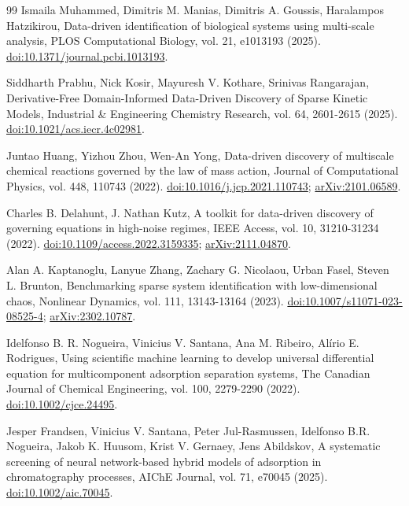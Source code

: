 \documentclass[11pt]{article}
\begin{document}
\begin{thebibliography}{99}
 Ismaila Muhammed, Dimitris M. Manias, Dimitris A. Goussis, Haralampos Hatzikirou, Data-driven identification of biological systems using multi-scale analysis, PLOS Computational Biology, vol. 21, e1013193 (2025). \href{https://doi.org/10.1371/journal.pcbi.1013193}{doi:10.1371/journal.pcbi.1013193}.

 Siddharth Prabhu, Nick Kosir, Mayuresh V. Kothare, Srinivas Rangarajan, Derivative-Free Domain-Informed Data-Driven Discovery of Sparse Kinetic Models, Industrial \& Engineering Chemistry Research, vol. 64, 2601-2615 (2025). \href{https://doi.org/10.1021/acs.iecr.4c02981}{doi:10.1021/acs.iecr.4c02981}.

 Juntao Huang, Yizhou Zhou, Wen-An Yong, Data-driven discovery of multiscale chemical reactions governed by the law of mass action, Journal of Computational Physics, vol. 448, 110743 (2022). \href{https://doi.org/10.1016/j.jcp.2021.110743}{doi:10.1016/j.jcp.2021.110743}; \href{https://arxiv.org/abs/2101.06589}{arXiv:2101.06589}.

 Charles B. Delahunt, J. Nathan Kutz, A toolkit for data-driven discovery of governing equations in high-noise regimes, IEEE Access, vol. 10, 31210-31234 (2022). \href{https://doi.org/10.1109/access.2022.3159335}{doi:10.1109/access.2022.3159335}; \href{https://arxiv.org/abs/2111.04870}{arXiv:2111.04870}.

 Alan A. Kaptanoglu, Lanyue Zhang, Zachary G. Nicolaou, Urban Fasel, Steven L. Brunton, Benchmarking sparse system identification with low-dimensional chaos, Nonlinear Dynamics, vol. 111, 13143-13164 (2023). \href{https://doi.org/10.1007/s11071-023-08525-4}{doi:10.1007/s11071-023-08525-4}; \href{https://arxiv.org/abs/2302.10787}{arXiv:2302.10787}.

 Idelfonso B. R. Nogueira, Vinicius V. Santana, Ana M. Ribeiro, Alírio E. Rodrigues, Using scientific machine learning to develop universal differential equation for multicomponent adsorption separation systems, The Canadian Journal of Chemical Engineering, vol. 100, 2279-2290 (2022). \href{https://doi.org/10.1002/cjce.24495}{doi:10.1002/cjce.24495}.

 Jesper Frandsen, Vinicius V. Santana, Peter Jul-Rasmussen, Idelfonso B.R. Nogueira, Jakob K. Huusom, Krist V. Gernaey, Jens Abildskov, A systematic screening of neural network-based hybrid models of adsorption in chromatography processes, AIChE Journal, vol. 71, e70045 (2025). \href{https://doi.org/10.1002/aic.70045}{doi:10.1002/aic.70045}.


\end{thebibliography}
\end{document}
